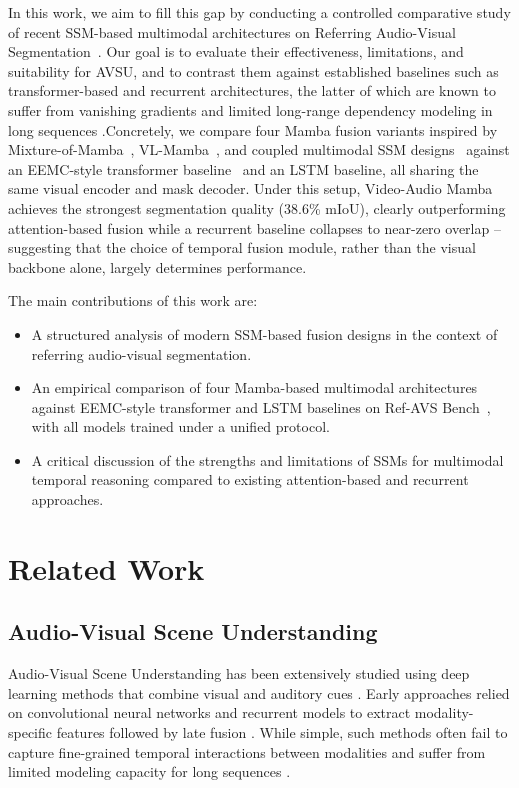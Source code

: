 \documentclass[a4paper,12pt]{extarticle}
\begin{document}
In this work, we aim to fill this gap by conducting a controlled comparative study of recent SSM-based multimodal architectures on Referring Audio-Visual Segmentation~\cite{wang2024refavs}. Our goal is to evaluate their effectiveness, limitations, and suitability for AVSU, and to contrast them against established baselines such as transformer-based and recurrent architectures, the latter of which are known to suffer from vanishing gradients and limited long-range dependency modeling in long sequences \cite{bengio1994learning, hochreiter1997long} .Concretely, we compare four Mamba fusion variants inspired by Mixture-of-Mamba~\cite{mixturemamba2025}, VL-Mamba~\cite{zhu2024vlmamba}, and coupled multimodal SSM designs~\cite{coupledmamba2024} against an EEMC-style transformer baseline~\cite{wang2024refavs} and an LSTM baseline, all sharing the same visual encoder and mask decoder. Under this setup, Video-Audio Mamba achieves the strongest segmentation quality (38.6\% mIoU), clearly outperforming attention-based fusion while a recurrent baseline collapses to near-zero overlap -- suggesting that the choice of temporal fusion module, rather than the visual backbone alone, largely determines performance.

The main contributions of this work are:
\begin{itemize}
    \item A structured analysis of modern SSM-based fusion designs in the context of referring audio-visual segmentation.
    \item An empirical comparison of four Mamba-based multimodal architectures against EEMC-style transformer and LSTM baselines on Ref-AVS Bench~\cite{wang2024refavs}, with all models trained under a unified protocol.
    \item A critical discussion of the strengths and limitations of SSMs for multimodal temporal reasoning compared to existing attention-based and recurrent approaches.
\end{itemize}

\section{Related Work}

\subsection{Audio-Visual Scene Understanding}

Audio-Visual Scene Understanding has been extensively studied using deep learning methods that combine visual and auditory cues \cite{tseng2023avsuperb, zhu2021deepAVSurvey}. Early approaches relied on convolutional neural networks and recurrent models to extract modality-specific features followed by late fusion \cite{tseng2023avsuperb, jl2401mlcaAVSR}. While simple, such methods often fail to capture fine-grained temporal interactions between modalities and suffer from limited modeling capacity for long sequences \cite{hochreiter1997long, weng2024audioVisualFusion}.
\end{document}

